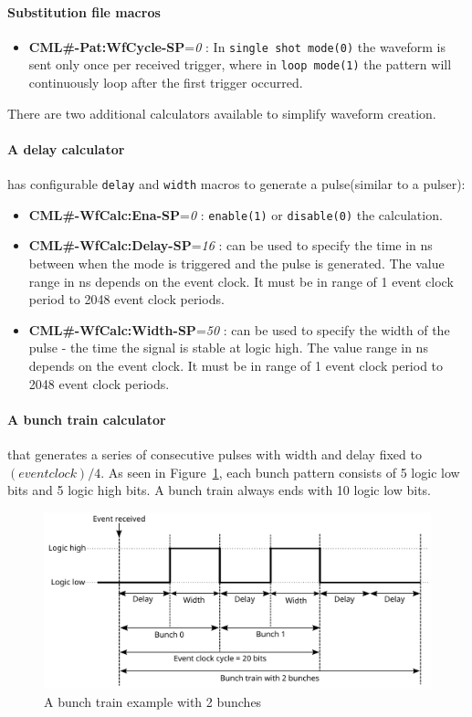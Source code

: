 \documentclass[12pt,a4paper]{article}
\begin{document}
\begin{itemize}
	\paragraph{Substitution file macros}
	\begin{itemize}
	\item
	  \textbf{CML\#-Pat:WfCycle-SP}=\emph{0} : In \texttt{single shot mode(0)} the
	  waveform is sent only once per received trigger, where in \texttt{loop mode(1)}
	  the pattern will continuously loop after the first trigger occurred.
	\end{itemize}
	
	There are two additional calculators available to simplify waveform creation. 
	\paragraph{A delay calculator} has configurable \texttt{delay} and \texttt{width} macros to generate a pulse(similar to a pulser):
	\begin{itemize}
	\item
	  \textbf{CML\#-WfCalc:Ena-SP}=\emph{0} : \texttt{enable(1)} or \texttt{disable(0)} the calculation.
	\item
	  \textbf{CML\#-WfCalc:Delay-SP}=\emph{16} : can be used to specify the time in ns between when the mode is triggered and the pulse is generated. The value range in ns depends on the event clock. It must be in range of 1 event clock period to 2048 event clock periods.
	\item
	  \textbf{CML\#-WfCalc:Width-SP}=\emph{50} : can be used to specify the width of the pulse - the time the signal is stable at logic high. The value range in ns depends on the event clock. It must be in range of 1 event clock period to 2048 event clock periods.
	\end{itemize}
	
	\paragraph{A bunch train calculator} that generates a series of consecutive pulses with width and delay fixed to $(event clock) / 4$. As seen in Figure~\ref{fig:output_cml_bunch}, each bunch pattern consists of 5 logic low bits and 5 logic high bits. A bunch train always ends with 10 logic low bits.
	\begin{figure}[H]
		\centering
		\includegraphics[width=0.96\columnwidth]{./img/bunchTrain}
		\caption{A bunch train example with 2 bunches}
		\label{fig:output_cml_bunch}
	\end{figure}
	

\end{itemize}
\end{document}
